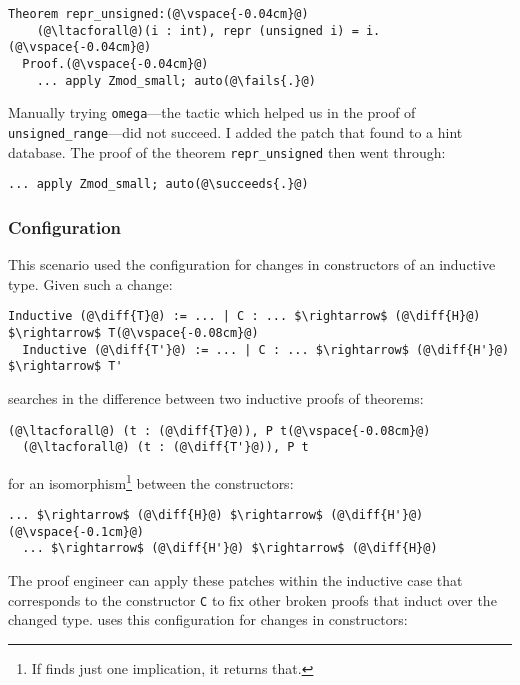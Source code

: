 \begin{lstlisting}[language=coq]
  Theorem repr_unsigned:(@\vspace{-0.04cm}@)
    (@\ltacforall@)(i : int), repr (unsigned i) = i.(@\vspace{-0.04cm}@)
  Proof.(@\vspace{-0.04cm}@)
    ... apply Zmod_small; auto(@\fails{.}@)
\end{lstlisting}
Manually trying \lstinline{omega}---the tactic which helped us in the proof of \lstinline{unsigned_range}---did not
succeed.
I added the patch that \sysname found to a hint database.
The proof of the theorem \lstinline{repr_unsigned} then went through:

\begin{lstlisting}[language=coq]
  ... apply Zmod_small; auto(@\succeeds{.}@)
\end{lstlisting}

\subsubsection{Configuration}

This scenario used the configuration for changes in constructors of an inductive type.
Given such a change:

\begin{lstlisting}[language=coq]
  Inductive (@\diff{T}@) := ... | C : ... $\rightarrow$ (@\diff{H}@) $\rightarrow$ T(@\vspace{-0.08cm}@)
  Inductive (@\diff{T'}@) := ... | C : ... $\rightarrow$ (@\diff{H'}@) $\rightarrow$ T'
\end{lstlisting}
\sysname searches in the difference between two inductive proofs of theorems:

\begin{lstlisting}[language=coq]
  (@\ltacforall@) (t : (@\diff{T}@)), P t(@\vspace{-0.08cm}@)
  (@\ltacforall@) (t : (@\diff{T'}@)), P t
\end{lstlisting}
for an isomorphism\footnote{If \sysname finds just one implication, it returns that.} between the constructors:

\begin{lstlisting}[language=coq]
  ... $\rightarrow$ (@\diff{H}@) $\rightarrow$ (@\diff{H'}@)(@\vspace{-0.1cm}@)
  ... $\rightarrow$ (@\diff{H'}@) $\rightarrow$ (@\diff{H}@)
\end{lstlisting}
The proof engineer can apply these patches within the inductive case that corresponds to the constructor \lstinline{C}
to fix other broken proofs that induct over the changed type. 
\sysname uses this configuration for changes in constructors:

